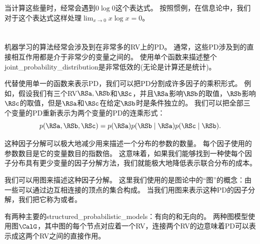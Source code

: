当计算这些量时，经常会遇到$0\log 0$这个表达式。
按照惯例，在信息论中，我们对于这个表达式这样处理$\lim_{x \to 0} x\log x = 0$。


\section{}
\label{sec:structured_probabilistic_models_chap3}

机器学习的算法经常会涉及到在非常多的\gls{RV}上的\gls{PD}。
通常，这些\gls{PD}涉及到的直接相互作用都是介于非常少的变量之间的。
使用单个函数来描述整个\gls{joint_probability_distribution}是非常低效的(无论是计算还是统计)。

代替使用单一的函数来表示\gls{PD}，我们可以把\gls{PD}分割成许多因子的乘积形式。
例如，假设我们有三个\gls{RV}$\RSa, \RSb$和$\RSc$，并且$\RSa$影响$\RSb$的取值，$\RSb$影响$\RSc$的取值，但是$\RSa$和$\RSc$在给定$\RSb$时是条件独立的。
我们可以把全部三个变量的\gls{PD}重新表示为两个变量的\gls{PD}的连乘形式：
\begin{equation}
p(\RSa, \RSb, \RSc) = p(\RSa)p(\RSb\mid \RSa)p(\RSc\mid\RSb).
\end{equation}

这种因子分解可以极大地减少用来描述一个分布的参数的数量。
每个因子使用的参数数目是它的变量数目的指数倍。
这意味着，如果我们能够找到一种使每个因子分布具有更少变量的因子分解方法，我们就能极大地降低表示联合分布的成本。

我们可以用图来描述这种因子分解。
这里我们使用的是图论中的``图''的概念：由一些可以通过边互相连接的顶点的集合构成。
当我们用图来表示这种\gls{PD}的因子分解，我们把它称为或者。

有两种主要的\gls{structured_probabilistic_models}：有向的和无向的。
两种图模型使用图$\CalG$，其中图的每个节点对应着一个\gls{RV}，连接两个\gls{RV}的边意味着\gls{PD}可以表示成这两个\gls{RV}之间的直接作用。

